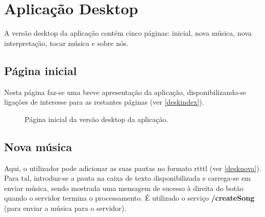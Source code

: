 \section{Aplicação Desktop}

A versão desktop da aplicação contém cinco páginas: inicial, nova música, nova interpretação, tocar música e sobre nós.

\subsection{Página inicial}
Nesta página faz-se uma breve apresentação da aplicação, disponibilizando-se ligações de interesse para as restantes páginas (ver \autoref{deskindex}).

\begin{figure}[htp]
\centering
{}
\caption{Página inicial da versão desktop da aplicação.}
\label{deskindex}
\end{figure}

\subsection{Nova música}
Aqui, o utilizador pode adicionar as suas pautas no formato \ac{rtttl} (ver \autoref{desknova}). Para tal, introduz-se a pauta na caixa de texto disponibilizada e carrega-se em enviar música, sendo mostrada uma mensagem de sucesso à direita do botão quando o servidor termina o processamento. É utilizado o serviço \textbf{/createSong} (para enviar a música para o servidor).

